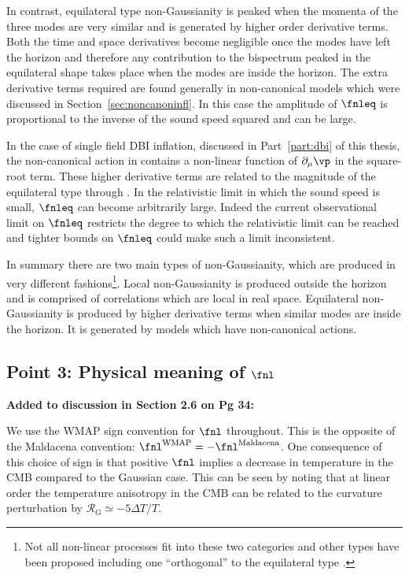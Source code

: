 In contrast, equilateral type non-Gaussianity is peaked when the momenta of the three modes are very
similar and is generated by higher order derivative terms. Both the time and space derivatives
become negligible once the modes have left the horizon and therefore any contribution to the
bispectrum peaked in the equilateral shape takes place when the modes are inside the
horizon. The extra derivative terms required are found generally in non-canonical models
which were discussed in Section~\ref{sec:noncanoninfl}. In this case the amplitude of $\fnleq$ is
proportional to the inverse of the sound speed squared and can be large.

In the case of single field DBI inflation, discussed in Part~\ref{part:dbi} of this thesis, the
non-canonical action in 
contains a non-linear function of $\partial_\mu \vp$ in the square-root term. These higher
derivative
terms are related to the magnitude of the equilateral type through . In the
relativistic limit in which the sound speed is small, $\fnleq$ can become arbitrarily large. Indeed
the current observational limit on $\fnleq$ restricts the degree to which the relativistic limit
can be reached and tighter bounds on $\fnleq$ could make such a limit inconsistent.

In summary there are two main types of non-Gaussianity, which are produced in very different
fashions\footnote{Not all non-linear processes fit into these two categories and other types have
been proposed including one ``orthogonal'' to the equilateral type \cite{Senatore:2009gt}.}. Local
non-Gaussianity is produced outside the horizon and is comprised of correlations which are local in
real space. Equilateral non-Gaussianity is produced by higher derivative terms when similar modes
are inside the horizon. It is generated by models which have non-canonical actions.


\subsection{Point 3: Physical meaning of \texorpdfstring{$\fnl$}{fNL}}
\textbf{Added to discussion in Section 2.6 on Pg 34:}

We use the WMAP sign convention for $\fnl$ throughout. 
This is the opposite of the Maldacena convention:
$\fnl^\mathrm{WMAP}=-\fnl^\mathrm{Maldacena}$. One consequence of this choice of sign is that
positive $\fnl$ implies a decrease in temperature in the CMB compared to the Gaussian case. This
can be seen by noting that at linear order the temperature anisotropy in the CMB can be related to
the curvature perturbation by $\mathcal{R}_\mathrm{G}\simeq -5 \Delta T/T$.

